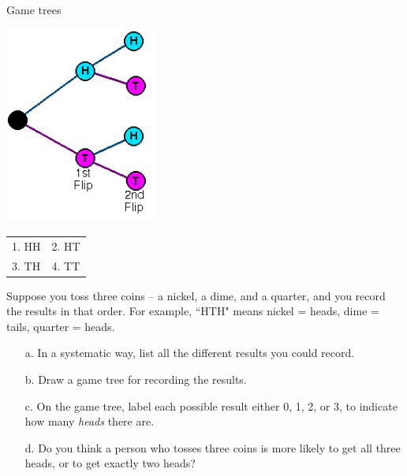 {\begin{intro}{Game trees}
        \begin{center}
            \includegraphics[width=5cm]{images/gametree.png}
            
            \begin{tabular}{l l}
                1. HH &  2. HT \\
                3. TH &  4. TT
            \end{tabular}
        \end{center}

    \end{intro}

    \begin{questionNOGRADE}{\thequestion}
        Suppose you toss three coins – a nickel, a dime, and a quarter,
        and you record the results in that order. For example,
        ``HTH" means nickel = heads, dime = tails, quarter = heads.

        \begin{enumerate}
            \item[a.] In a systematic way, list all the different results you could record.
            \item[b.] Draw a game tree for recording the results.
            \item[c.] On the game tree, label each possible result either 0, 1, 2, or 3,
            to indicate how many \textit{heads} there are.
            \item[d.] Do you think a person who tosses three coins is more likely to get all
            three heads, or to get exactly two heads?                
        \end{enumerate}
    \end{questionNOGRADE}
    
}
